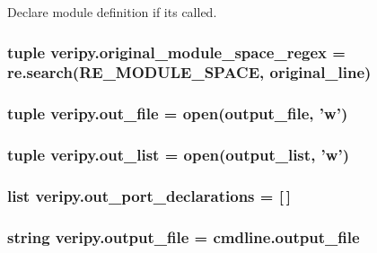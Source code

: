 Declare module definition if its called. 

\hypertarget{namespaceveripy_a3816a72d0c349d678a422f19923a5266}{
\subsubsection[{original\-\_\-module\-\_\-space\-\_\-regex}]{\setlength{\rightskip}{0pt plus 5cm}tuple veripy.\-original\-\_\-module\-\_\-space\-\_\-regex = re.\-search(R\-E\-\_\-\-M\-O\-D\-U\-L\-E\-\_\-\-S\-P\-A\-C\-E, {\bf original\-\_\-line})}}\label{namespaceveripy_a3816a72d0c349d678a422f19923a5266}
\hypertarget{namespaceveripy_a680636d6f9937fd2b1957fd55a5389b8}{
\subsubsection[{out\-\_\-file}]{\setlength{\rightskip}{0pt plus 5cm}tuple veripy.\-out\-\_\-file = open({\bf output\-\_\-file}, 'w')}}\label{namespaceveripy_a680636d6f9937fd2b1957fd55a5389b8}
\hypertarget{namespaceveripy_a3c87219c0df570bcd1bebb41ee3c4adc}{
\subsubsection[{out\-\_\-list}]{\setlength{\rightskip}{0pt plus 5cm}tuple veripy.\-out\-\_\-list = open({\bf output\-\_\-list}, 'w')}}\label{namespaceveripy_a3c87219c0df570bcd1bebb41ee3c4adc}
\hypertarget{namespaceveripy_a2aa010b557e59bc1d12efd8479d6a242}{
\subsubsection[{out\-\_\-port\-\_\-declarations}]{\setlength{\rightskip}{0pt plus 5cm}list veripy.\-out\-\_\-port\-\_\-declarations = \mbox{[}$\,$\mbox{]}}}\label{namespaceveripy_a2aa010b557e59bc1d12efd8479d6a242}
\hypertarget{namespaceveripy_acf3a579572b494d5b9d6ec35c9df7688}{
\subsubsection[{output\-\_\-file}]{\setlength{\rightskip}{0pt plus 5cm}string veripy.\-output\-\_\-file = cmdline.\-output\-\_\-file}}\label{namespaceveripy_acf3a579572b494d5b9d6ec35c9df7688}
